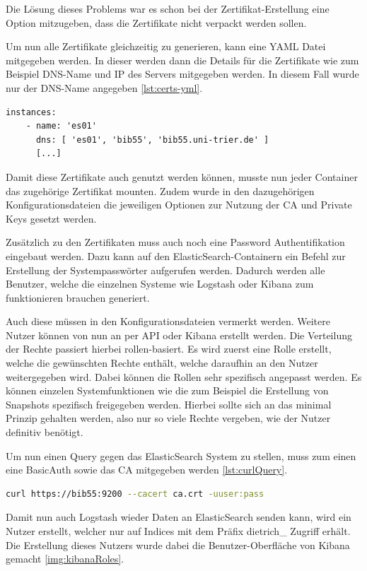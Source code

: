 Die Lösung dieses Problems war es schon bei der Zertifikat-Erstellung eine Option mitzugeben, dass die Zertifikate nicht verpackt werden sollen. 

Um nun alle Zertifikate gleichzeitig zu generieren, kann eine YAML Datei mitgegeben werden. In dieser werden dann die Details für die Zertifikate wie zum Beispiel DNS-Name und IP des Servers mitgegeben werden. In diesem Fall wurde nur der DNS-Name angegeben \ref{lst:certs-yml}.

\begin{lstlisting}[language=XML, frame=single, label={lst:certs-yml}] 
	instances:
	- name: 'es01'
	  dns: [ 'es01', 'bib55', 'bib55.uni-trier.de' ]
	  [...]
\end{lstlisting}

Damit diese Zertifikate auch genutzt werden können, musste nun jeder Container das zugehörige Zertifikat mounten. Zudem wurde in den dazugehörigen Konfigurationsdateien die jeweiligen Optionen zur Nutzung der CA und Private Keys gesetzt werden.

Zusätzlich zu den Zertifikaten muss auch noch eine Password Authentifikation eingebaut werden. Dazu kann auf den ElasticSearch-Containern ein Befehl zur Erstellung der Systempasswörter aufgerufen werden. Dadurch werden alle Benutzer, welche die einzelnen Systeme wie Logstash oder Kibana zum funktionieren brauchen generiert.

Auch diese müssen in den Konfigurationsdateien vermerkt werden. Weitere Nutzer können von nun an per API oder Kibana erstellt werden. Die Verteilung der Rechte passiert hierbei rollen-basiert. Es wird zuerst eine Rolle erstellt, welche die gewünschten Rechte enthält, welche daraufhin an den Nutzer weitergegeben wird. Dabei können die Rollen sehr spezifisch angepasst werden. Es können einzelen Systemfunktionen wie die zum Beispiel die Erstellung von Snapshots spezifisch freigegeben werden. Hierbei sollte sich an das minimal Prinzip gehalten werden, also nur so viele Rechte vergeben, wie der Nutzer definitiv benötigt.

Um nun einen Query gegen das ElasticSearch System zu stellen, muss zum einen eine BasicAuth sowie das CA mitgegeben werden \ref{lst:curlQuery}.

\begin{lstlisting}[language=BASH, frame=single, label={lst:curlQuery}] 
	curl https://bib55:9200 --cacert ca.crt -uuser:pass
\end{lstlisting}

Damit nun auch Logstash wieder Daten an ElasticSearch senden kann, wird ein Nutzer erstellt, welcher nur auf Indices mit dem Präfix dietrich\_ Zugriff erhält. Die Erstellung dieses Nutzers wurde dabei die Benutzer-Oberfläche von Kibana gemacht \ref{img:kibanaRoles}. 

